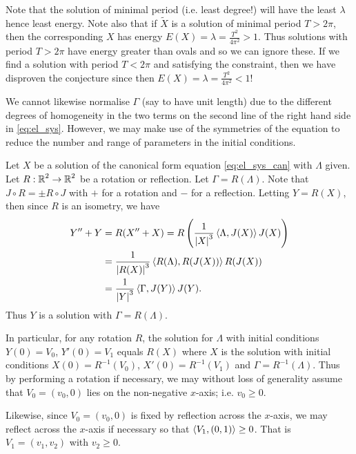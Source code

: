 \documentclass[12pt]{article}
\begin{document}
\begin{rem}
Note that the solution of minimal period (i.e. least degree!) will have the least \(\lambda\) hence least energy. Note also that if \(\tilde{X}\) is a solution of minimal period \(T > 2\pi\), then the corresponding \(X\) has energy \(E(X) = \lambda = \tfrac{T^2}{4\pi^2} > 1\). Thus solutions with period \(T > 2\pi\) have energy greater than ovals and so we can ignore these. If we find a solution with period \(T < 2\pi\) and satisfying the constraint, then we have disproven the conjecture since then \(E(X) = \lambda = \tfrac{T^2}{4\pi^2} < 1\)!
\end{rem}

We cannot likewise normalise \(\Gamma\) (say to have unit length) due to the different degrees of homogeneity in the two terms on the second line of the right hand side in \eqref{eq:el_sys}. However, we may make use of the symmetries of the equation to reduce the number and range of parameters in the initial conditions.

Let \(X\) be a solution of the canonical form equation \eqref{eq:el_sys_can} with \(\Lambda\) given. Let \(R : \operatorname{\mathbb{R}}^2 \to \operatorname{\mathbb{R}}^2\) be a rotation or reflection. Let \(\Gamma = R(\Lambda)\). Note that \(J \circ R = \pm R \circ J\) with \(+\) for a rotation and \(-\) for a reflection. Letting \(Y = R(X)\), then since \(R\) is an isometry, we have
\[
\begin{split}
Y'' + Y &= R(X'' + X) = R\left(\frac{1}{\left|{X}\right|^3} \left\langle{\Lambda},{J(X)}\right\rangle J(X)\right) \\
&= \frac{1}{\left|{R(X)}\right|^3} \left\langle{R(\Lambda)},{R(J(X))}\right\rangle R(J(X)) \\
&= \frac{1}{\left|{Y}\right|^3} \left\langle{\Gamma},{J(Y)}\right\rangle J(Y).
\end{split}
\]
Thus \(Y\) is a solution with \(\Gamma = R(\Lambda)\).

In particular, for any rotation \(R\), the solution for \(\Lambda\) with initial conditions \(Y(0) = V_0\), \(Y'(0) = V_1\) equals \(R(X)\) where \(X\) is the solution with initial conditions \(X(0) = R^{-1}(V_0)\), \(X'(0) = R^{-1}(V_1)\) and \(\Gamma = R^{-1}(\Lambda)\). Thus by performing a rotation if necessary, we may without loss of generality assume that \(V_0 = (v_0, 0)\) lies on the non-negative \(x\)-axis; i.e. \(v_0 \geq 0\).

Likewise, since \(V_0 = (v_0, 0)\) is fixed by reflection across the \(x\)-axis, we may reflect across the \(x\)-axis if necessary so that \(\left\langle{V_1},{(0, 1)}\right\rangle \geq 0\). That is \(V_1 = (v_1, v_2)\) with \(v_2 \geq 0\).
\end{document}
